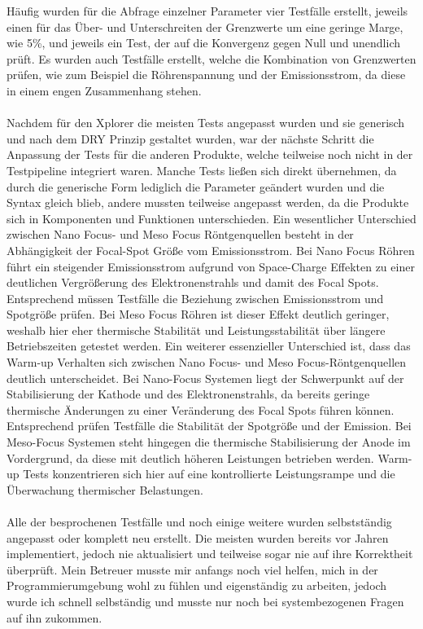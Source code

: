 \documentclass[12pt]{article} %
\begin{document}
Häufig wurden für die Abfrage einzelner Parameter vier Testfälle erstellt, jeweils einen für das Über- und Unterschreiten der Grenzwerte um eine geringe Marge, wie 5\%, und jeweils ein Test, der auf die Konvergenz gegen Null und unendlich prüft. Es wurden auch Testfälle erstellt, welche die Kombination von Grenzwerten prüfen, wie zum Beispiel die Röhrenspannung und der Emissionsstrom, da diese in einem engen Zusammenhang stehen. 
\\
\\
Nachdem für den Xplorer die meisten Tests angepasst wurden und sie generisch und nach dem DRY Prinzip gestaltet wurden, war der nächste Schritt die Anpassung der Tests für die anderen Produkte, welche teilweise noch nicht in der Testpipeline integriert waren.
Manche Tests ließen sich direkt übernehmen, da durch die generische Form lediglich die Parameter geändert wurden und die Syntax gleich blieb, andere mussten teilweise angepasst werden, da die Produkte sich in Komponenten und Funktionen unterschieden.
Ein wesentlicher Unterschied zwischen Nano Focus- und Meso Focus Röntgenquellen besteht in der Abhängigkeit der Focal-Spot Größe vom Emissionsstrom. Bei Nano Focus Röhren führt ein steigender Emissionsstrom aufgrund von Space-Charge Effekten zu einer deutlichen Vergrößerung des Elektronenstrahls und damit des Focal Spots.
Entsprechend müssen Testfälle die Beziehung zwischen Emissionsstrom und Spotgröße prüfen. Bei Meso Focus Röhren ist dieser Effekt deutlich geringer, weshalb hier eher thermische Stabilität und Leistungsstabilität über längere Betriebszeiten getestet werden.
Ein weiterer essenzieller Unterschied ist, dass das Warm-up Verhalten sich zwischen Nano Focus- und Meso Focus-Röntgenquellen deutlich unterscheidet. Bei Nano-Focus Systemen liegt der Schwerpunkt auf der Stabilisierung der Kathode und des Elektronenstrahls, da bereits geringe thermische Änderungen zu einer Veränderung des Focal Spots führen können. Entsprechend prüfen Testfälle die Stabilität der Spotgröße und der Emission.
Bei Meso-Focus Systemen steht hingegen die thermische Stabilisierung der Anode im Vordergrund, da diese mit deutlich höheren Leistungen betrieben werden. Warm-up Tests konzentrieren sich hier auf eine kontrollierte Leistungsrampe und die Überwachung thermischer Belastungen.
\\
\\
Alle der besprochenen Testfälle und noch einige weitere wurden selbstständig angepasst oder komplett neu erstellt. Die meisten wurden bereits vor Jahren implementiert, jedoch nie aktualisiert und teilweise sogar nie auf ihre Korrektheit überprüft. Mein Betreuer musste mir anfangs noch viel helfen, mich in der Programmierumgebung wohl zu fühlen und eigenständig zu arbeiten, jedoch wurde ich schnell selbständig und musste nur noch bei systembezogenen Fragen auf ihn zukommen.
\end{document}
